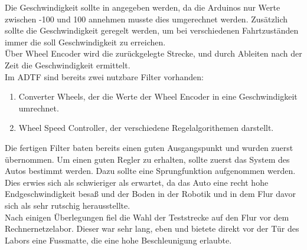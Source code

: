 \documentclass[a4paper,12pt]{report}
\begin{document}
	Die Geschwindigkeit sollte in \meter\per\second\usk angegeben werden, da die Arduinos nur Werte zwischen -100 und 100 annehmen musste dies umgerechnet werden. Zusätzlich sollte die Geschwindigkeit geregelt werden, um bei verschiedenen Fahrtzuständen immer die soll Geschwindigkeit zu erreichen. \\
	Über Wheel Encoder wird die zurückgelegte Strecke, und durch Ableiten nach der Zeit die Geschwindigkeit ermittelt. \\
	Im ADTF sind bereits zwei nutzbare Filter vorhanden:
	\begin{enumerate}[label=]
		\item Converter Wheels, der die Werte der Wheel Encoder in eine Geschwindigkeit umrechnet. \\
		\item Wheel Speed Controller, der verschiedene Regelalgorithemen darstellt. \\
	\end{enumerate}
	Die fertigen Filter baten bereits einen guten Ausgangspunkt und wurden zuerst übernommen. Um einen guten Regler zu erhalten, sollte zuerst das System des Autos bestimmt werden. Dazu sollte eine Sprungfunktion aufgenommen werden. Dies erwies sich als schwieriger als erwartet, da das Auto eine recht hohe Endgeschwindigkeit besaß und der Boden in der Robotik und in dem Flur davor sich als sehr rutschig herausstellte. \\
	Nach einigen Überlegungen fiel die Wahl der Teststrecke auf den Flur vor dem Rechnernetzelabor. Dieser war sehr lang, eben und bietete direkt vor der Tür des Labors eine Fussmatte, die eine hohe Beschleunigung erlaubte. \\
\end{document}

